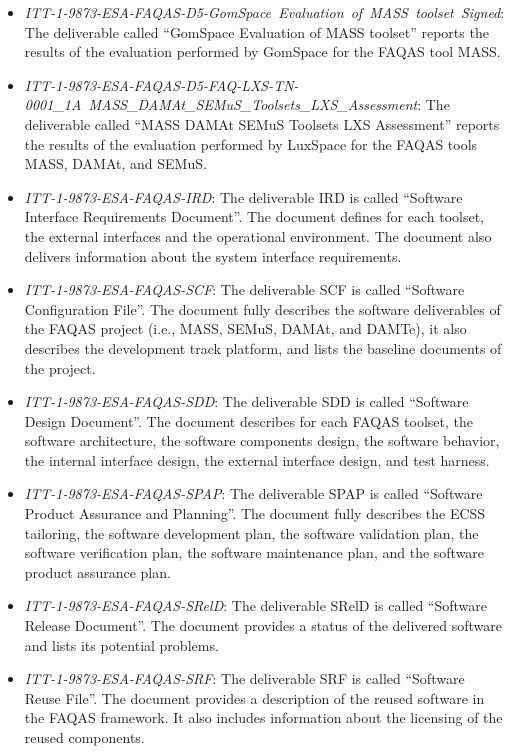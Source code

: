 \begin{itemize}
	\item \emph{ITT-1-9873-ESA-FAQAS-D5-GomSpace\ Evaluation\ of\ MASS\ toolset\ Signed}: The deliverable called ``GomSpace Evaluation of MASS toolset'' reports the results of the evaluation performed by GomSpace for the FAQAS tool MASS.

	\item \emph{ITT-1-9873-ESA-FAQAS-D5-FAQ-LXS-TN-0001\_1A\ MASS\_DAMAt\_SEMuS\_Toolsets\_LXS\_Assessment}: The deliverable called ``MASS DAMAt SEMuS Toolsets LXS Assessment'' reports the results of the evaluation performed by LuxSpace for the FAQAS tools MASS, DAMAt, and SEMuS.

	\item \emph{ITT-1-9873-ESA-FAQAS-IRD}: The deliverable IRD is called ``Software Interface Requirements Document''. The document defines for each toolset, the external interfaces and the operational environment. The document also delivers information about the system interface requirements.

	\item \emph{ITT-1-9873-ESA-FAQAS-SCF}: The deliverable SCF is called ``Software Configuration File''. The document fully describes the software deliverables of the FAQAS project (i.e., MASS, SEMuS, DAMAt, and DAMTe), it also describes the development track platform, and lists the baseline documents of the project.

	\item \emph{ITT-1-9873-ESA-FAQAS-SDD}: The deliverable SDD is called ``Software Design Document''. The document describes for each FAQAS toolset, the software architecture, the software components design, the software behavior, the internal interface design, the external interface design, and test harness.

	\item \emph{ITT-1-9873-ESA-FAQAS-SPAP}: The deliverable SPAP is called ``Software Product Assurance and Planning''. The document fully describes the ECSS tailoring, the software development plan, the software validation plan, the software verification plan, the software maintenance plan, and the software product assurance plan.

	\item \emph{ITT-1-9873-ESA-FAQAS-SRelD}: The deliverable SRelD is called ``Software Release Document''. The document provides a status of the delivered software and lists its potential problems.

	\item \emph{ITT-1-9873-ESA-FAQAS-SRF}: The deliverable SRF is called ``Software Reuse File''. The document provides a description of the reused software in the FAQAS framework. It also includes information about the licensing of the reused components.


\end{itemize}
